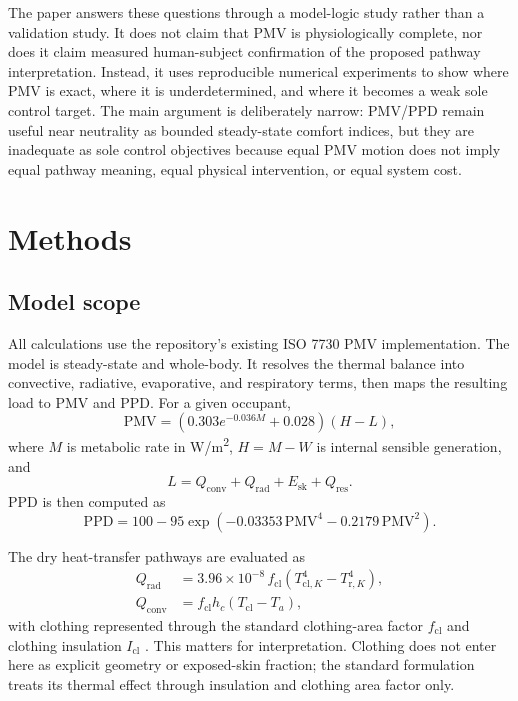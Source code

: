 \documentclass[preprint,authoryear,12pt]{elsarticle}
\begin{document}
The paper answers these questions through a model-logic study rather than a validation study. It does not claim that PMV is physiologically complete, nor does it claim measured human-subject confirmation of the proposed pathway interpretation. Instead, it uses reproducible numerical experiments to show where PMV is exact, where it is underdetermined, and where it becomes a weak sole control target. The main argument is deliberately narrow: PMV/PPD remain useful near neutrality as bounded steady-state comfort indices, but they are inadequate as sole control objectives because equal PMV motion does not imply equal pathway meaning, equal physical intervention, or equal system cost.

\section{Methods}

\subsection{Model scope}

All calculations use the repository's existing ISO 7730 PMV implementation. The model is steady-state and whole-body. It resolves the thermal balance into convective, radiative, evaporative, and respiratory terms, then maps the resulting load to PMV and PPD. For a given occupant,
\begin{equation}
\mathrm{PMV} = \left(0.303 e^{-0.036 M} + 0.028\right)(H-L),
\end{equation}
where $M$ is metabolic rate in \si{W/m^2}, $H=M-W$ is internal sensible generation, and
\begin{equation}
L = Q_{\mathrm{conv}} + Q_{\mathrm{rad}} + E_{\mathrm{sk}} + Q_{\mathrm{res}}.
\end{equation}
PPD is then computed as
\begin{equation}
\mathrm{PPD} = 100 - 95 \exp\left(-0.03353\, \mathrm{PMV}^4 - 0.2179\, \mathrm{PMV}^2\right).
\end{equation}

The dry heat-transfer pathways are evaluated as
\begin{align}
Q_{\mathrm{rad}} &= 3.96 \times 10^{-8}\, f_{\mathrm{cl}} \left(T_{\mathrm{cl},K}^4 - T_{\mathrm{r},K}^4\right), \\
Q_{\mathrm{conv}} &= f_{\mathrm{cl}} h_c \left(T_{\mathrm{cl}} - T_a\right),
\end{align}
with clothing represented through the standard clothing-area factor $f_{\mathrm{cl}}$ and clothing insulation $I_{\mathrm{cl}}$ \citep{Fanger1970,ISO7730_2025}. This matters for interpretation. Clothing does not enter here as explicit geometry or exposed-skin fraction; the standard formulation treats its thermal effect through insulation and clothing area factor only.
\end{document}
